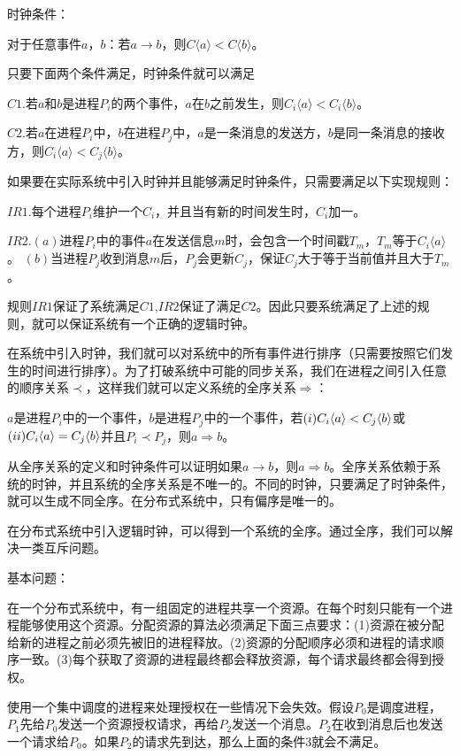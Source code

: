 \documentclass[UTF8]{article}
\begin{document}
	时钟条件：
	
	对于任意事件$a$，$b$：若$a \to b$，则$C \langle a \rangle < C \langle b \rangle$。
	
	只要下面两个条件满足，时钟条件就可以满足
	
	$C1$.若$a$和$b$是进程$P_i$的两个事件，$a$在$b$之前发生，则$C_i \langle a \rangle < C_i \langle b \rangle$。

	$C2$.若$a$在进程$P_i$中，$b$在进程$P_j$中，$a$是一条消息的发送方，$b$是同一条消息的接收方，则$C_i \langle a \rangle < C_j \langle b \rangle$。

	如果要在实际系统中引入时钟并且能够满足时钟条件，只需要满足以下实现规则：

	$IR1$.每个进程$P_i$维护一个$C_i$，并且当有新的时间发生时，$C_i$加一。

	$IR2$.$(a)$进程$P_i$中的事件$a$在发送信息$m$时，会包含一个时间戳$T_m$，$T_m$等于$C_i \langle a \rangle$。
		 $(b)$当进程$P_j$收到消息$m$后，$P_j$会更新$C_j$，保证$C_j$大于等于当前值并且大于$T_m$。

	规则$IR1$保证了系统满足$C1$,$IR2$保证了满足$C2$。因此只要系统满足了上述的规则，就可以保证系统有一个正确的逻辑时钟。

	在系统中引入时钟，我们就可以对系统中的所有事件进行排序（只需要按照它们发生的时间进行排序）。为了打破系统中可能的同步关系，我们在进程之间引入任意的顺序关系$\prec$，这样我们就可以定义系统的全序关系$\Rightarrow$：
	
	$a$是进程$P_i$中的一个事件，$b$是进程$P_j$中的一个事件，若$(\romannumeral1)C_i\langle a \rangle < C_j \langle b \rangle$或$(\romannumeral2) C_i\langle a \rangle = C_j \langle b \rangle$并且$P_i \prec P_j$，则$a \Rightarrow b$。

	从全序关系的定义和时钟条件可以证明如果$a \rightarrow b$，则$a \Rightarrow b$。全序关系依赖于系统的时钟，并且系统的全序关系是不唯一的。不同的时钟，只要满足了时钟条件，就可以生成不同全序。在分布式系统中，只有偏序是唯一的。

	在分布式系统中引入逻辑时钟，可以得到一个系统的全序。通过全序，我们可以解决一类互斥问题。

	基本问题：

	在一个分布式系统中，有一组固定的进程共享一个资源。在每个时刻只能有一个进程能够使用这个资源。分配资源的算法必须满足下面三点要求：(1)资源在被分配给新的进程之前必须先被旧的进程释放。(2)资源的分配顺序必须和进程的请求顺序一致。(3)每个获取了资源的进程最终都会释放资源，每个请求最终都会得到授权。
	
	使用一个集中调度的进程来处理授权在一些情况下会失效。假设$P_0$是调度进程，$P_1$先给$P_0$发送一个资源授权请求，再给$P_2$发送一个消息。$P_2$在收到消息后也发送一个请求给$P_0$。如果$P_2$的请求先到达，那么上面的条件3就会不满足。
	
\end{document}
